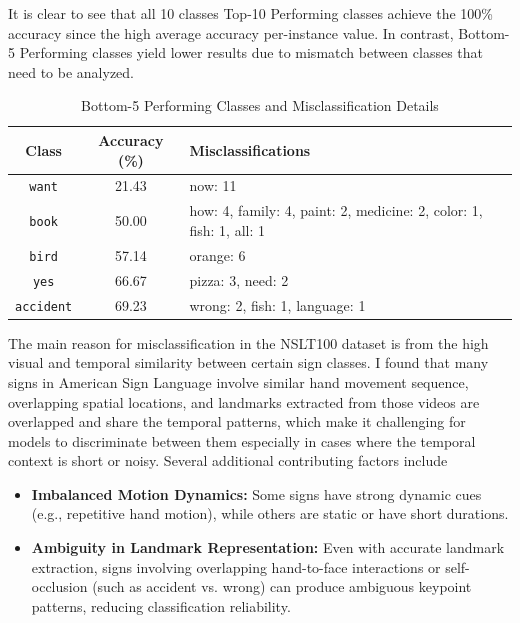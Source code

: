 \documentclass{article}
\begin{document}
It is clear to see that all 10 classes Top-10 Performing classes achieve the 100\% accuracy since the high average accuracy per-instance value. In contrast, Bottom-5 Performing classes yield lower results due to mismatch between classes that need to be analyzed.

\begin{table}[htbp]
\centering
\label{tab:bottom5_accuracy}
\begin{tabular}{|c|c|p{8cm}|}
\hline
\textbf{Class} & \textbf{Accuracy (\%)} & \textbf{Misclassifications} \\
\hline
\texttt{want} & 21.43 & now: 11 \\
\hline
\texttt{book} & 50.00 & how: 4, family: 4, paint: 2, medicine: 2, color: 1, fish: 1, all: 1 \\
\hline
\texttt{bird} & 57.14 & orange: 6 \\
\hline
\texttt{yes} & 66.67 & pizza: 3, need: 2 \\
\hline
\texttt{accident} & 69.23 & wrong: 2, fish: 1, language: 1 \\
\hline
\end{tabular}
\caption{Bottom-5 Performing Classes and Misclassification Details}
\end{table}

The main reason for misclassification in the NSLT100 dataset is from the high visual and temporal similarity between certain sign classes. I found that many signs in American Sign Language involve similar hand movement sequence, overlapping spatial locations, and landmarks extracted from those videos are overlapped and share the temporal patterns, which make it challenging for models to discriminate between them especially in cases where the temporal context is short or noisy. Several additional contributing factors include

\begin{itemize}
    \item \textbf{Imbalanced Motion Dynamics:} Some signs have strong dynamic cues (e.g., repetitive hand motion), while others are static or have short durations.
    \item \textbf{Ambiguity in Landmark Representation:} Even with accurate landmark extraction, signs involving overlapping hand-to-face interactions or self-occlusion (such as accident vs. wrong) can produce ambiguous keypoint patterns, reducing classification reliability. 
\end{itemize}
\end{document}
